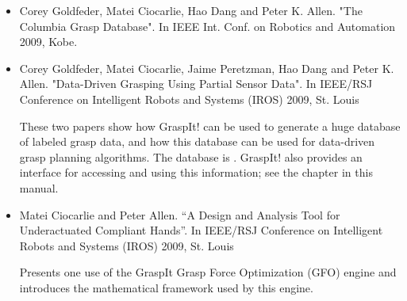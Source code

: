 \begin{itemize}
\item Corey Goldfeder, Matei Ciocarlie, Hao Dang and Peter
  K. Allen. "The Columbia Grasp Database". In IEEE Int. Conf. on
  Robotics and Automation 2009, Kobe.

\item Corey Goldfeder, Matei Ciocarlie, Jaime Peretzman, Hao Dang and
  Peter K. Allen. "Data-Driven Grasping Using Partial Sensor Data". In
  IEEE/RSJ Conference on Intelligent Robots and Systems (IROS) 2009,
  St. Louis

These two papers show how GraspIt! can be used to generate a huge
database of labeled grasp data, and how this database can be used for
data-driven grasp planning algorithms. The database is . GraspIt! also provides
an interface for accessing and using this information; see the
 chapter in this manual.

\item Matei Ciocarlie and Peter Allen. ``A Design and Analysis Tool
  for Underactuated Compliant Hands''. In IEEE/RSJ Conference on
  Intelligent Robots and Systems (IROS) 2009, St. Louis

Presents one use of the GraspIt Grasp Force Optimization (GFO) engine
and introduces the mathematical framework used by this engine.

\end{itemize}

